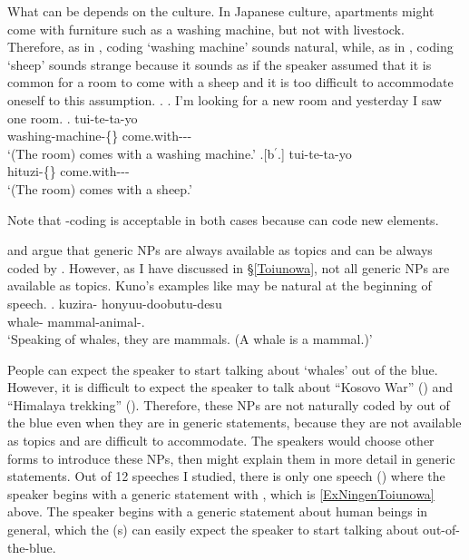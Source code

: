 What can be  depends on the culture.
In Japanese culture,
apartments might come with furniture such as a washing machine,
but not with livestock.
Therefore, as in \Next[b],
 coding  `washing machine' sounds natural,
while, as in \Next[b$^{\prime}$],
 coding  `sheep' sounds strange
because it sounds as if the speaker assumed that it is common for a room to come with a sheep
and it is too difficult to accommodate oneself to this assumption.
\ex.\label{ExSentakuki}
 \a. I'm looking for a new room and yesterday I saw one room.
 \bg.  tui-te-ta-yo \\
 	washing-machine-\{\} come.with--- \\
	`(The room) comes with a washing machine.'
 \bg.[b$^{\prime}$.]  tui-te-ta-yo \\
 	hituzi-\{\} come.with--- \\
	`(The room) comes with a sheep.'

Note that -coding is acceptable in both cases
because  can code new elements.

 and  argue that
generic NPs are always available as topics and
can be always coded by .
However, as I have discussed in \S \ref{Toiunowa},
not all generic NPs are available as topics.
Kuno's examples like \Next may be natural at the beginning of speech.
%
\exg. kuzira- honyuu-doobutu-desu \\
      whale- mammal-animal-. \\
      `Speaking of whales, they are mammals. (A whale is a mammal.)'
      \hfill{\cite[44]{kuno73}}

People can expect the speaker to start talking about  `whales' out of the blue.
However, it is difficult to expect the speaker to talk about
``Kosovo War'' () and ``Himalaya trekking'' ().
Therefore,
these NPs  are not naturally coded by  out of the blue
even when they are in generic statements,
because they are not available as topics and are difficult to accommodate.
The speakers would choose other forms to introduce these NPs,
then might explain them in more detail in generic statements.
Out of 12 speeches I studied,
there is only one speech () where the speaker begins with a generic statement with ,
which is \ref{ExNingenToiunowa} above.
The speaker begins with a generic statement about human beings in general,
which the (s) can easily expect the speaker to start talking about out-of-the-blue.

